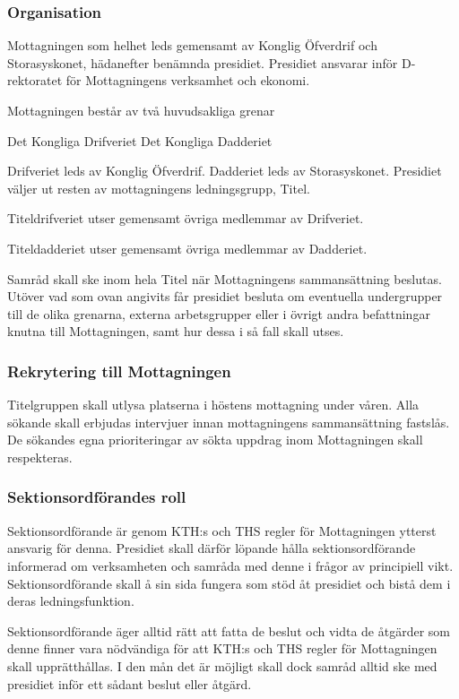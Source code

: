 \documentclass[a4paper,12pt]{article}
\begin{document}
\subsubsection{Organisation}

Mottagningen som helhet leds gemensamt av Konglig Öfverdrif och Storasyskonet, hädanefter benämnda presidiet. Presidiet ansvarar inför D-rektoratet för Mottagningens verksamhet och ekonomi.

Mottagningen består av två huvudsakliga grenar

Det Kongliga Drifveriet
Det Kongliga Dadderiet

Drifveriet leds av Konglig Öfverdrif. Dadderiet leds av Storasyskonet. Presidiet väljer ut resten av mottagningens ledningsgrupp, Titel.

Titeldrifveriet utser gemensamt övriga medlemmar av Drifveriet.

Titeldadderiet utser gemensamt övriga medlemmar av Dadderiet.

Samråd skall ske inom hela Titel när Mottagningens sammansättning beslutas. Utöver vad som ovan angivits får presidiet besluta om eventuella undergrupper till de olika grenarna, externa arbetsgrupper eller i övrigt andra befattningar knutna till Mottagningen, samt hur dessa i så fall skall utses.

\subsubsection{Rekrytering till Mottagningen}

Titelgruppen skall utlysa platserna i höstens mottagning under våren. Alla sökande skall erbjudas intervjuer innan mottagningens sammansättning fastslås. De sökandes egna prioriteringar av sökta uppdrag inom Mottagningen skall respekteras.

\subsubsection{Sektionsordförandes roll}

Sektionsordförande är genom KTH:s och THS regler för Mottagningen ytterst ansvarig för denna. Presidiet skall därför löpande hålla sektionsordförande informerad om verksamheten och samråda med denne i frågor av principiell vikt. Sektionsordförande skall å sin sida fungera som stöd åt presidiet och bistå dem i deras ledningsfunktion.

Sektionsordförande äger alltid rätt att fatta de beslut och vidta de åtgärder som denne finner vara nödvändiga för att KTH:s och THS regler för Mottagningen skall upprätthållas. I den mån det är möjligt skall dock samråd alltid ske med presidiet inför ett sådant beslut eller åtgärd.
\end{document}
